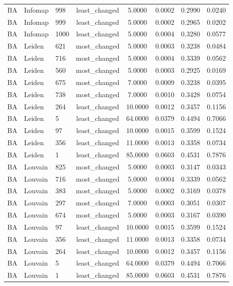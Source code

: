 \begin{longtable}{lllccccc}
BA & Infomap & 998 & least\_changed & 5.0000 & 0.0002 & 0.2990 & 0.0240 \\
BA & Infomap & 999 & least\_changed & 5.0000 & 0.0002 & 0.2965 & 0.0202 \\
BA & Infomap & 1000 & least\_changed & 5.0000 & 0.0004 & 0.3280 & 0.0577 \\
BA & Leiden & 621 & most\_changed & 5.0000 & 0.0003 & 0.3238 & 0.0484 \\
BA & Leiden & 716 & most\_changed & 5.0000 & 0.0004 & 0.3339 & 0.0562 \\
BA & Leiden & 560 & most\_changed & 5.0000 & 0.0003 & 0.2925 & 0.0169 \\
BA & Leiden & 675 & most\_changed & 7.0000 & 0.0009 & 0.3238 & 0.0395 \\
BA & Leiden & 738 & most\_changed & 7.0000 & 0.0010 & 0.3428 & 0.0754 \\
BA & Leiden & 264 & least\_changed & 10.0000 & 0.0012 & 0.3457 & 0.1156 \\
BA & Leiden & 5 & least\_changed & 64.0000 & 0.0379 & 0.4494 & 0.7066 \\
BA & Leiden & 97 & least\_changed & 10.0000 & 0.0015 & 0.3599 & 0.1524 \\
BA & Leiden & 356 & least\_changed & 11.0000 & 0.0013 & 0.3358 & 0.0734 \\
BA & Leiden & 1 & least\_changed & 85.0000 & 0.0603 & 0.4531 & 0.7876 \\
BA & Louvain & 825 & most\_changed & 5.0000 & 0.0003 & 0.3147 & 0.0343 \\
BA & Louvain & 716 & most\_changed & 5.0000 & 0.0004 & 0.3339 & 0.0562 \\
BA & Louvain & 383 & most\_changed & 5.0000 & 0.0002 & 0.3169 & 0.0378 \\
BA & Louvain & 297 & most\_changed & 7.0000 & 0.0003 & 0.3051 & 0.0307 \\
BA & Louvain & 674 & most\_changed & 5.0000 & 0.0003 & 0.3167 & 0.0390 \\
BA & Louvain & 97 & least\_changed & 10.0000 & 0.0015 & 0.3599 & 0.1524 \\
BA & Louvain & 356 & least\_changed & 11.0000 & 0.0013 & 0.3358 & 0.0734 \\
BA & Louvain & 264 & least\_changed & 10.0000 & 0.0012 & 0.3457 & 0.1156 \\
BA & Louvain & 5 & least\_changed & 64.0000 & 0.0379 & 0.4494 & 0.7066 \\
BA & Louvain & 1 & least\_changed & 85.0000 & 0.0603 & 0.4531 & 0.7876 \\

\end{longtable}
